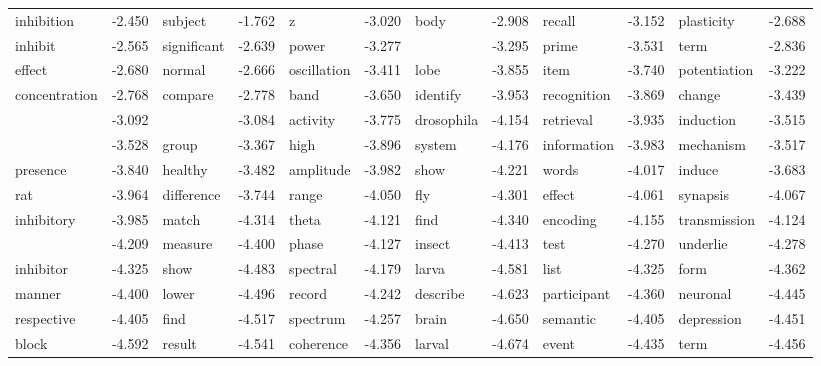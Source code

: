 \documentclass{article}
\begin{document}
\begin{table}
{\begin{tabular}{|l r|l r|l r|l r|l r|l r|}
inhibition & -2.450 & subject & -1.762 & z & -3.020 & body & -2.908 & recall & -3.152 & plasticity & -2.688\\
inhibit & -2.565 & significant & -2.639 & power & -3.277 &  & -3.295 & prime & -3.531 & term & -2.836\\
effect & -2.680 & normal & -2.666 & oscillation & -3.411 & lobe & -3.855 & item & -3.740 & potentiation & -3.222\\
concentration & -2.768 & compare & -2.778 & band & -3.650 & identify & -3.953 & recognition & -3.869 & change & -3.439\\
 & -3.092 &  & -3.084 & activity & -3.775 & drosophila & -4.154 & retrieval & -3.935 & induction & -3.515\\
 & -3.528 & group & -3.367 & high & -3.896 & system & -4.176 & information & -3.983 & mechanism & -3.517\\
presence & -3.840 & healthy & -3.482 & amplitude & -3.982 & show & -4.221 & words & -4.017 & induce & -3.683\\
rat & -3.964 & difference & -3.744 & range & -4.050 & fly & -4.301 & effect & -4.061 & synapsis & -4.067\\
inhibitory & -3.985 & match & -4.314 & theta & -4.121 & find & -4.340 & encoding & -4.155 & transmission & -4.124\\
 & -4.209 & measure & -4.400 & phase & -4.127 & insect & -4.413 & test & -4.270 & underlie & -4.278\\
inhibitor & -4.325 & show & -4.483 & spectral & -4.179 & larva & -4.581 & list & -4.325 & form & -4.362\\
manner & -4.400 & lower & -4.496 & record & -4.242 & describe & -4.623 & participant & -4.360 & neuronal & -4.445\\
respective & -4.405 & find & -4.517 & spectrum & -4.257 & brain & -4.650 & semantic & -4.405 & depression & -4.451\\
block & -4.592 & result & -4.541 & coherence & -4.356 & larval & -4.674 & event & -4.435 & term & -4.456\\
\hline
\end{tabular}
}
\end{table}
\end{document}
